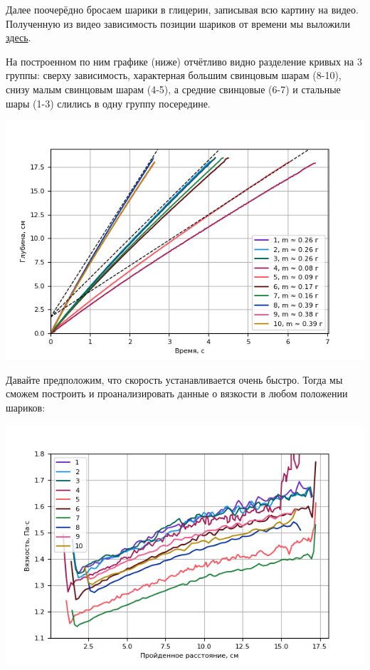 \documentclass[a4paper, 12pt]{article}
\begin{document}
    Далее поочерёдно бросаем шарики в глицерин, записывая всю картину на видео.
    Полученную из видео зависимость позиции шариков от времени мы выложили
    \href{https://github.com/phys-labs-at-hse/glycerine/tree/master/particular_balls}{здесь}.

    На построенном по ним графике (ниже) отчётливо видно разделение кривых на 3 группы: сверху зависимость,
    характерная большим свинцовым шарам (8-10), снизу малым свинцовым шарам (4-5),
    а средние свинцовые (6-7) и стальные шары (1-3) слились в одну группу посередине.

    \includegraphics{position-time.png}

    Давайте предположим, что скорость устанавливается очень быстро.
    Тогда мы сможем построить и проанализировать данные о вязкости в любом положении шариков:

    \includegraphics{viscosity-position.png}
\end{document}
